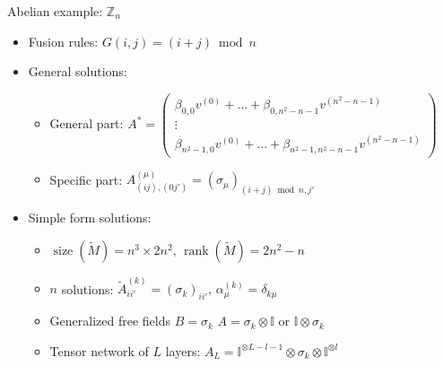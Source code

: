 \documentclass{fdubeamer}
\newcommand{\1}{\mathbb{1}}
\newcommand{\I}{\mathbb{I}}
\newcommand{\Z}{\mathbb{Z}}
\DeclareMathOperator{\rank}{rank}
\begin{document}
\begin{frame}{Abelian example: \texorpdfstring{$\Z_n$}{ℤₙ}}

\linespread{1.4}
\selectfont

\begin{itemize}
  \item Fusion rules: $G(i,j) = (i+j)\bmod n$
  \item General solutions:

    \begin{itemize}
      \item General part:
        $
          A^* = \left( \begin{smallmatrix}
            \beta_{0,0} v^{(0)} + \dots + \beta_{0,n^2-n-1} v^{(n^2-n-1)} \\[0.5ex]
            \vdots \\
            \beta_{n^2-1,0} v^{(0)} + \dots + \beta_{n^2-1,n^2-n-1} v^{(n^2-n-1)}
          \end{smallmatrix} \right)
        $
      \item Specific part: $A^{(\mu)}_{(ij), (0j')} = (\sigma_\mu)_{(i+j)\bmod n, j'}$
    \end{itemize}

  \item Simple form solutions:

    \begin{itemize}
      \item $\operatorname{size}(\tilde{M})=n^3\times2n^2, \, \rank(\tilde{M})=2n^2-n$
      \item $n$ solutions: $\tilde{A}^{(k)}_{ii'} = (\sigma_k)_{ii'}, \, \alpha^{(k)}_\mu = \delta_{k\mu}$
      \item Generalized free fields $B=\sigma_k$ \textrightarrow{} $A=\sigma_k\otimes\I$ or $\I\otimes\sigma_k$
      \item Tensor network of $L$ layers: $A_L = \I^{\otimes L-l-1} \otimes \sigma_k \otimes \I^{\otimes l}$
    \end{itemize}
\end{itemize}

\end{frame}
\end{document}
